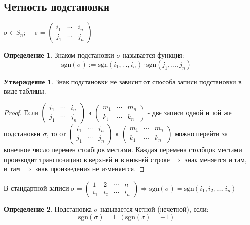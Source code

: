 \documentclass[a4paper, 12pt]{article}
\theoremstyle{definition}
\newtheorem*{definition}{Определение}
\newtheorem*{subtheorem}{Утверждение}
\begin{document}
  \subsection{Четность подстановки}
  $\sigma \in S_n$; \ \ $\sigma = \begin{pmatrix}
    i_1 & \cdots & i_n \\
    j_1 & \cdots & j_n
  \end{pmatrix}$  
  \begin{definition}
    Знаком подстановки $\sigma$ называется функция: 
    $$\textrm{sgn} (\sigma):= \textrm{sgn}(i_1,...,i_n)\cdot \textrm{sgn}(j_1,...,j_n)$$  
  \end{definition} 
  \begin{subtheorem}
    Знак подстановки не зависит от способа записи подстановки в виде таблицы.
  \end{subtheorem} 
  \begin{proof}
    Если $\begin{pmatrix}
    i_1 & \cdots & i_n \\
    j_1 & \cdots & j_n
  \end{pmatrix}$ и $\begin{pmatrix}
    m_1 & \cdots & m_n \\
    k_1 & \cdots & k_n
  \end{pmatrix}$ - две записи одной и той же подстановки $\sigma$, то от $\begin{pmatrix}
    i_1 & \cdots & i_n \\
    j_1 & \cdots & j_n
  \end{pmatrix}$ к $\begin{pmatrix}
    m_1 & \cdots & m_n \\
    k_1 & \cdots & k_n
  \end{pmatrix}$ можно перейти за конечное число перемен столбцов местами. Каждая перемена столбцов местами производит транспозицию в верхней и в нижней строке $\Longrightarrow $ знак меняется и там, и там $\Longrightarrow $ знак произведения не изменяется. 
  \end{proof} 
  В стандартной записи $\sigma = \begin{pmatrix}
    1 & 2 & \cdots & n \\
    i_1 & i_2 & \cdots & i_n
  \end{pmatrix} \Longrightarrow \textrm{sgn} (\sigma) = \textrm{sgn} (i_1,i_2,...,i_n)$  
  \begin{definition}
    Подстановка $\sigma$ называется четной (нечетной), если: 
    $$\textrm{sgn} (\sigma) = 1 \ \ (\textrm{sgn} (\sigma) = -1)$$  
  \end{definition} 
\end{document}
